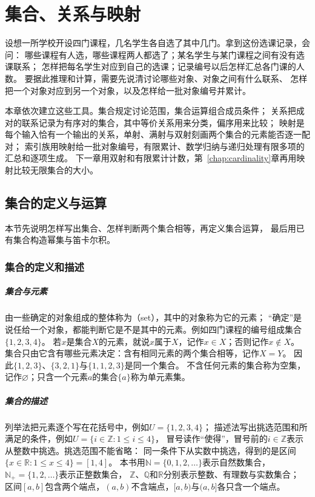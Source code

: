 \chapter{集合、关系与映射}
\label{chap:sets-functions-and-proofs}
\label{chap:sets-relations-maps}

设想一所学校开设四门课程，几名学生各自选了其中几门。拿到这份选课记录，会问：
哪些课程有人选，哪些课程两人都选了；某名学生与某门课程之间有没有选课联系；
怎样把每名学生对应到自己的选课；记录编号以后怎样汇总各门课的人数。
要据此推理和计算，需要先说清讨论哪些对象、对象之间有什么联系、
怎样把一个对象对应到另一个对象，以及怎样给一批对象编号并累计。

本章依次建立这些工具。集合规定讨论范围，集合运算组合成员条件；
关系把成对的联系记录为有序对的集合，其中等价关系用来分类，偏序用来比较；
映射是每个输入恰有一个输出的关系，单射、满射与双射刻画两个集合的元素能否逐一配对；
索引族用映射给一批对象编号，有限累计、数学归纳与递归处理有限多项的汇总和逐项生成。
下一章用双射和有限累计计数，第~\ref{chap:cardinality}章再用映射比较无限集合的大小。

\section{集合的定义与运算}
\label{sec:prelim-sets-relations-functions}

本节先说明怎样写出集合、怎样判断两个集合相等，再定义集合运算，
最后用已有集合构造幂集与笛卡尔积。

\subsection{集合的定义和描述}
\label{sec:prelim-set-definition}

\paragraph{集合与元素}
由一些确定的对象组成的整体称为（set），其中的对象称为它的元素；
“确定”是说任给一个对象，都能判断它是不是其中的元素。例如四门课程的编号组成集合$\{1,2,3,4\}$。
若$x$是集合$X$的元素，就说$x$属于$X$，记作$x\in X$；否则记作$x\notin X$。
集合只由它含有哪些元素决定：含有相同元素的两个集合相等，记作$X=Y$。
因此$\{1,2,3\}$、$\{3,2,1\}$与$\{1,1,2,3\}$是同一个集合。
不含任何元素的集合称为空集，记作$\varnothing$；只含一个元素$a$的集合$\{a\}$称为单元素集。

\paragraph{集合的描述}
列举法把元素逐个写在花括号中，例如$U=\{1,2,3,4\}$；
描述法写出挑选范围和所满足的条件，例如$U=\{i\in\mathbb Z:1\leq i\leq4\}$，
冒号读作“使得”，冒号前的$i\in\mathbb Z$表示从整数中挑选。挑选范围不能省略：
同一条件下从实数中挑选，得到的是区间$\{x\in\mathbb R:1\leq x\leq4\}=[1,4]$。
本书用$\mathbb N=\{0,1,2,\ldots\}$表示自然数集合，$\mathbb N_+=\{1,2,\ldots\}$表示正整数集合，
$\mathbb Z$、$\mathbb Q$和$\mathbb R$分别表示整数、有理数与实数集合；
区间$[a,b]$包含两个端点，$(a,b)$不含端点，$[a,b)$与$(a,b]$各只含一个端点。

